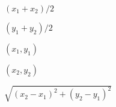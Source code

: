 \documentclass{article}
\begin{document}
$(x_1+x_2)/2$
\pagebreak

$(y_1+y_2)/2$
\pagebreak

$(x_1,y_1)$
\pagebreak

$(x_2,y_2)$
\pagebreak

$\sqrt{(x_2-x_1)^2+(y_2-y_1)^2}$
\pagebreak
\end{document}
